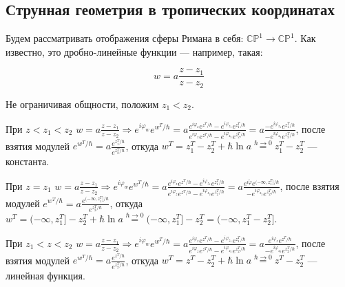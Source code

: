 \documentclass[11pt]{article}
\def\R{\Rightarrow}
\def\ph{\varphi}
\theoremstyle{remark}
\theoremstyle{definition}
\begin{document}
\subsection{Струнная геометрия в тропических координатах}

Будем рассматривать отображения сферы Римана в себя: $\mathbb{CP}^1 \to \mathbb{CP}^1$. Как известно, это дробно-линейные функции --- например, такая:

$$w = a\frac{z-z_1}{z-z_2}$$

Не ограничивая общности, положим $z_1 < z_2$.

При $z<z_1<z_2$ $w = a\frac{z-z_1}{z-z_2} \R e^{i\ph_w} e^{w^T/\hbar} = a \frac{e^{i\ph_{z}} e^{z^T/\hbar} - e^{i\ph_{z_1}} e^{z_1^T/\hbar} }{e^{i\ph_{z}} e^{z^T/\hbar} - e^{i\ph_{z_2}} e^{z_2^T/\hbar}} =  a \frac{ - e^{i\ph_{z_1}} e^{z_1^T/\hbar} }{- e^{i\ph_{z_2}} e^{z_2^T/\hbar}}$, после взятия модулей $e^{w^T/\hbar} = a \frac{e^{z_1^T/\hbar} }{ e^{z_2^T/\hbar}}$, откуда $w^T = z_1^T - z_2^T + \hbar \ln a \stackrel{\hbar \to 0}{=} \boxed{z_1^T - z_2^T}$ --- константа.

При $z = z_1$ $w = a\frac{z-z_1}{z-z_2} \R e^{i\ph_w} e^{w^T/\hbar} = a \frac{e^{i\ph_{z}} e^{z^T/\hbar} - e^{i\ph_{z_1}} e^{z_1^T/\hbar} }{e^{i\ph_{z}} e^{z^T/\hbar} - e^{i\ph_{z_2}} e^{z_2^T/\hbar}} =  a \frac{ e^{i\tilde\ph} e^{(-\infty, z_1^T]/\hbar} }{- e^{i\ph_{z_2}} e^{z_2^T/\hbar}}$, после взятия модулей $e^{w^T/\hbar} = a \frac{e^{(-\infty, z_1^T]/\hbar} }{ e^{z_2^T/\hbar}}$, откуда $w^T = (-\infty, z_1^T] - z_2^T + \hbar \ln a \stackrel{\hbar \to 0}{=} (-\infty, z_1^T] - z_2^T = \boxed{(-\infty, z_1^T - z_2^T]}$.


При $z_1<z<z_2$ $w = a\frac{z-z_1}{z-z_2} \R e^{i\ph_w} e^{w^T/\hbar} = a \frac{e^{i\ph_{z}} e^{z^T/\hbar} - e^{i\ph_{z_1}} e^{z_1^T/\hbar} }{e^{i\ph_{z}} e^{z^T/\hbar} - e^{i\ph_{z_2}} e^{z_2^T/\hbar}} =  a \frac{ e^{i\ph_{z}} e^{z^T/\hbar} }{- e^{i\ph_{z_2}} e^{z_2^T/\hbar}}$, после взятия модулей $e^{w^T/\hbar} = a \frac{e^{z^T/\hbar} }{ e^{z_2^T/\hbar}}$, откуда $w^T = z^T - z_2^T + \hbar \ln a \stackrel{\hbar \to 0}{=} \boxed{z^T - z_2^T}$ --- линейная функция.
\end{document}
